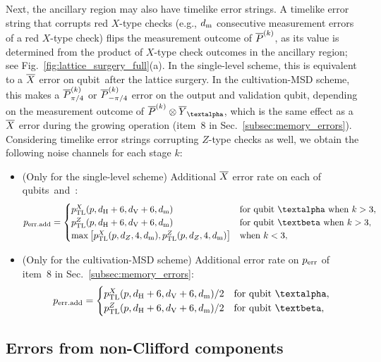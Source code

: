 \documentclass[
 prx,
 reprint,
 superscriptaddress,
 longbibliography,
 dvipsnames
]{revtex4-2}
\begin{document}
\begin{widetext}
Next, the ancillary region may also have timelike error strings.
A timelike error string that corrupts red $X$-type checks (e.g., $d_{\mathrm{m}}$ consecutive measurement errors of a red $X$-type check) flips the measurement outcome of $\overline{P}^{(k)}$, as its value is determined from the product of $X$-type check outcomes in the ancillary region; see Fig.~\ref{fig:lattice_surgery_full}(a).
In the single-level scheme, this is equivalent to a $\overline{X}$ error on qubit~\talpha after the lattice surgery.
In the cultivation-MSD scheme, this makes a $\overline{P}^{(k)}_{\pi/4}$ or $\overline{P}^{(k)}_{-\pi/4}$ error on the output and validation qubit, depending on the measurement outcome of $\Pstage{k} \otimes \lgy_\mralpha$, which is the same effect as a $\overline{X}$ error during the growing operation (item~8 in Sec.~\ref{subsec:memory_errors}).
Considering timelike error strings corrupting $Z$-type checks as well, we obtain the following noise channels for each stage $k$:
\begin{itemize}
    \item (Only for the single-level scheme) Additional $\overline{X}$ error rate on each of qubits~\talpha and~\tbeta:
    \begin{align*}
        p_\mr{err.add} = \begin{cases}
            \ptimelike{X}(p, \dH + 6, \dV + 6, \dm) & \text{for qubit~\talpha when $k > 3$}, \\
            \ptimelike{Z}(p, \dH + 6, \dV + 6, \dm) & \text{for qubit~\tbeta when $k > 3$}, \\
            \max\qty[\ptimelike{X}(p, \dz, 4, \dm), \ptimelike{Z}(p, \dz, 4, \dm)] & \text{when $k < 3$},
        \end{cases}
    \end{align*}
    \item (Only for the cultivation-MSD scheme) Additional error rate on $p_{\mathrm{err}}$ of item~8 in Sec.~\ref{subsec:memory_errors}:
    \begin{align*}
        p_\mr{err.add} = \begin{cases}
            \ptimelike{X}(p, \dH + 6, \dV + 6, \dm)/2 & \text{for qubit~\talpha}, \\
            \ptimelike{Z}(p, \dH + 6, \dV + 6, \dm)/2 & \text{for qubit~\tbeta}, \\
        \end{cases}
    \end{align*}
\end{itemize}

\subsection{Errors from non-Clifford components \label{subsec:errors_from_nonclifford_components}}


\end{widetext}
\end{document}
